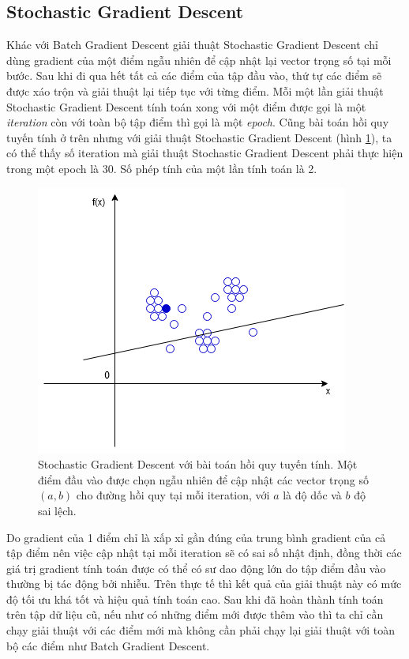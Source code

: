 \subsection{Stochastic Gradient Descent}
Khác với Batch Gradient Descent giải thuật Stochastic Gradient Descent chỉ dùng gradient của một điểm ngẫu nhiên để cập nhật lại vector trọng số tại mỗi bước. Sau khi đi qua hết tất cả các điểm của tập đầu vào, thứ tự các điểm sẽ được xáo trộn và giải thuật lại tiếp tục với từng điểm. Mỗi một lần giải thuật Stochastic Gradient Descent tính toán xong với một điểm được gọi là một \emph{iteration} còn với toàn bộ tập điểm thì gọi là một \emph{epoch}. Cũng bài toán hồi quy tuyến tính ở trên nhưng với giải thuật Stochastic Gradient Descent (hình \ref{fig:stochastic_gradient_descent}), ta có thể thấy số iteration mà giải thuật Stochastic Gradient Descent phải thực hiện trong một epoch là 30. Số phép tính của một lần tính toán là 2. 
\begin{figure}[ht!]
	\centerline{\includegraphics[scale=0.6]{images/stochastic_gradient_descent.png}}
  	\caption{Stochastic Gradient Descent với bài toán hồi quy tuyến tính. Một điểm đầu vào được chọn ngẫu nhiên để cập nhật các vector trọng số $(a,b)$ cho đường hồi quy tại mỗi iteration, với $a$ là độ dốc và $b$ độ sai lệch.}
  	\label{fig:stochastic_gradient_descent}
\end{figure}

Do gradient của 1 điểm chỉ là xấp xỉ gần đúng của trung bình gradient của cả tập điểm nên việc cập nhật tại mỗi iteration sẽ có sai số nhật định, đồng thời các giá trị gradient tính toán được có thể có sư dao động lớn do tập điểm đầu vào thường bị tác động bởi nhiễu. Trên thực tế thì kết quả của giải thuật này có mức độ tối ưu khá tốt và hiệu quả tính toán cao. Sau khi đã hoàn thành tính toán trên tập dữ liệu cũ, nếu như có những điểm mới được thêm vào thì ta chỉ cần chạy giải thuật với các điểm mới mà không cần phải chạy lại giải thuật với toàn bộ các điểm như Batch Gradient Descent.
